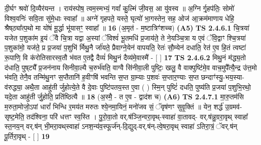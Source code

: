 \documentclass[17pt]{extarticle}
\begin{document}
                  दी॒र्घꣳ श्रवो॑ दि॒व्यैर॑यन्त । राय॑स्पोष॒ त्वम॒स्मभ्यं॒ गवां᳚ कु॒ल्मिं जी॒वस॒ आ यु॑वस्व ॥ अ॒ग्नि र्गृ॒हप॑तिः॒ सोमो॑ विश्व॒वनिः॑ सवि॒ता सु॑मे॒धाः स्वाहा᳚ ॥ अग्ने॑ गृहपते॒ यस्ते॒ घृत्यो॑ भा॒गस्तेन॒ सह॒ ओज॑ आ॒क्रम॑माणाय धेहि॒ श्रैष्‌ठ्या᳚त्प॒थो मा यो॑षं मू॒र्द्धा भू॑यासꣳ॒॒ स्वाहा᳚ ॥ \textbf{  16} \newline
                  \newline
                      (अ॒मृत॑ - म॒ष्टात्रिꣳ॑शच्च)  \textbf{(A5)} \newline \newline
                                        \textbf{ TS 2.4.6.1} \newline
                  चि॒त्रया॑ यजेत प॒शुका॑म इ॒यं ॅवै चि॒त्रा यद्वा अ॒स्यां ॅविश्वं॑ भू॒तमधि॑ प्र॒जाय॑ते॒ ते ने॒यञ्चि॒त्रा य ए॒वं ॅवि॒द्वाꣳ श्चि॒त्रया॑ प॒शुका॑मो॒ यज॑ते॒ प्र प्र॒जया॑ प॒शुभि॑ र्मिथु॒नै र्जा॑यते॒ प्रैवाग्ने॒येन॑ वापयति॒ रेतः॑ सौ॒म्येन॑ दधाति॒ रेत॑ ए॒व हि॒तं त्वष्टा॑ रू॒पाणि॒ वि क॑रोतिसारस्व॒तौ भ॑वत ए॒तद्वै दैव्यं॑ मिथु॒नं दैव्य॑मे॒वास्मै॑ - [  ] \textbf{  17} \newline
                  \newline
                                \textbf{ TS 2.4.6.2} \newline
                  मिथु॒नं म॑द्ध्य॒तो द॑धाति॒ पुष्‌ट्यै᳚ प्र॒जन॑नाय सिनीवा॒ल्यै च॒रुर्भ॑वति॒ वाग्वै सि॑नीवा॒ली पुष्टिः॒ खलु॒ वै वाक्पुष्टि॑मे॒व वाच॒मुपै᳚त्यै॒न्द्र उ॑त्त॒मो भ॑वति॒ तेनै॒व तन्मि॑थु॒नꣳ स॒प्तैतानि॑ ह॒वीꣳषि॑ भवन्ति स॒प्त ग्रा॒म्याः प॒शवः॑ स॒प्तार॒ण्याः स॒प्त छन्दाꣳ॑स्यु॒-भय॒स्या-व॑रुद्ध्या॒ अथै॒ता आहु॑ती र्जुहोत्ये॒ते वै दे॒वाः पुष्टि॑पतय॒स्त ए॒वा ( ) स्मि॒न् पुष्टिं॑ दधति॒ पुष्य॑ति प्र॒जया॑ प॒शुभि॒रथो॒ यदे॒ता आहु॑ती र्जु॒होति॒ प्रति॑ष्ठित्यै ॥ \textbf{  18} \newline
                  \newline
                      (अ॒स्मै॒ - त ए॒व - द्वाद॑श च)  \textbf{(A6)} \newline \newline
                                        \textbf{ TS 2.4.7.1} \newline
                  मा॒रु॒तम॑सि म॒रुता॒मोजो॒ऽपां धारां᳚ भिन्धि र॒मय॑त मरुतः श्ये॒नमा॒यिनं॒ मनो॑जव सं॒ ॅवृष॑णꣳ सुवृ॒क्तिं ॥ येन॒ शर्द्ध॑ उ॒ग्रमव॑-सृष्ट॒मेति॒ तद॑श्विना॒ परि॑ धत्तꣳ स्व॒स्ति । पु॒रो॒वा॒तो वर्.ष॑ञ्जि॒न्वरा॒वृथ्-स्वाहा॑ वा॒तावद्- वर्.ष॑न्नु॒ग्ररा॒वृथ् स्वाहा᳚ स्त॒नय॒न् वर्.ष॑न् भी॒मरा॒वथ्‌स्वाहा॑ ऽनश॒न्य॑व॒स्फूर्ज॑न्-दि॒द्युद्-वर्.ष॑न्-त्वे॒षरा॒वृथ् स्वाहा॑ ऽतिरा॒त्रं॒ ॅवर्.ष॑न् पू॒र्तिरा॒वृथ् - [  ] \textbf{  19} \newline
\end{document}

